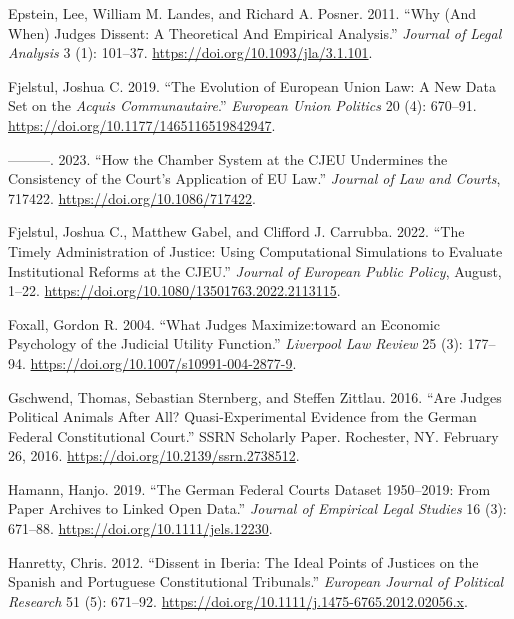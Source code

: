 \documentclass[
  11pt,
]{article}
\newlength{\cslhangindent}
\newenvironment{CSLReferences}[2] %
 {%
  \setlength{\parindent}{0pt}
  \ifodd #1 \everypar{\setlength{\hangindent}{\cslhangindent}}\ignorespaces\fi
  \ifnum #2 > 0
  \setlength{\parskip}{#2\baselineskip}
  \fi
 }%
 {}
\begin{document}
\begin{CSLReferences}{1}{0}
\leavevmode{}%
Epstein, Lee, William M. Landes, and Richard A. Posner. 2011. {``Why
({And When}) {Judges Dissent}: {A Theoretical And Empirical
Analysis}.''} \emph{Journal of Legal Analysis} 3 (1): 101--37.
\url{https://doi.org/10.1093/jla/3.1.101}.

\leavevmode{}%
Fjelstul, Joshua C. 2019. {``The Evolution of {European Union} Law: {A}
New Data Set on the {\emph{Acquis Communautaire}}.''} \emph{European
Union Politics} 20 (4): 670--91.
\url{https://doi.org/10.1177/1465116519842947}.

\leavevmode{}%
---------. 2023. {``How the {Chamber System} at the {CJEU Undermines}
the {Consistency} of the {Court}'s {Application} of {EU Law}.''}
\emph{Journal of Law and Courts}, 717422.
\url{https://doi.org/10.1086/717422}.

\leavevmode{}%
Fjelstul, Joshua C., Matthew Gabel, and Clifford J. Carrubba. 2022.
{``The Timely Administration of Justice: Using Computational Simulations
to Evaluate Institutional Reforms at the {CJEU}.''} \emph{Journal of
European Public Policy}, August, 1--22.
\url{https://doi.org/10.1080/13501763.2022.2113115}.

\leavevmode{}%
Foxall, Gordon R. 2004. {``What Judges Maximize:toward an Economic
Psychology of the Judicial Utility Function.''} \emph{Liverpool Law
Review} 25 (3): 177--94.
\url{https://doi.org/10.1007/s10991-004-2877-9}.

\leavevmode{}%
Gschwend, Thomas, Sebastian Sternberg, and Steffen Zittlau. 2016. {``Are
{Judges Political Animals} After {All}? {Quasi-Experimental Evidence}
from the {German Federal Constitutional Court}.''} SSRN Scholarly Paper.
{Rochester, NY}. February 26, 2016.
\url{https://doi.org/10.2139/ssrn.2738512}.

\leavevmode{}%
Hamann, Hanjo. 2019. {``The {German Federal Courts Dataset} 1950--2019:
{From Paper Archives} to {Linked Open Data}.''} \emph{Journal of
Empirical Legal Studies} 16 (3): 671--88.
\url{https://doi.org/10.1111/jels.12230}.

\leavevmode{}%
Hanretty, Chris. 2012. {``Dissent in {Iberia}: {The} Ideal Points of
Justices on the {Spanish} and {Portuguese Constitutional Tribunals}.''}
\emph{European Journal of Political Research} 51 (5): 671--92.
\url{https://doi.org/10.1111/j.1475-6765.2012.02056.x}.


\end{CSLReferences}
\end{document}
